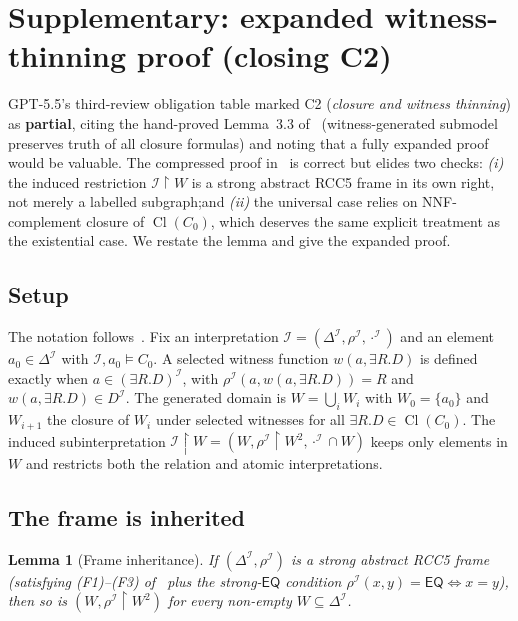 \documentclass[11pt]{article}
\newtheorem{lemma}[theorem]{Lemma}
\newcommand{\Cl}{\operatorname{Cl}}
\newcommand{\EQ}{\mathsf{EQ}}
\newcommand{\I}{\mathcal{I}}
\newcommand{\PARTIAL}{\textcolor{black!60!orange}{\textbf{partial}}}
\begin{document}
\section{Supplementary: expanded witness-thinning proof (closing C2)}
\label{sec:thinning}

GPT-5.5's third-review obligation table marked C2 (\emph{closure and
witness thinning}) as \PARTIAL{}, citing the hand-proved
Lemma~3.3 of~\cite{repaired} (witness-generated submodel preserves
truth of all closure formulas) and noting that a fully expanded
proof would be valuable.  The compressed proof
in~\cite[\S3.3]{repaired} is correct but elides two checks:\@
\emph{(i)} the induced restriction \(\I \restriction W\) is a strong
abstract RCC5 frame in its own right, not merely a labelled
subgraph;\@ and \emph{(ii)} the universal case relies on
NNF-complement closure of \(\Cl(C_0)\), which deserves the same
explicit treatment as the existential case.  We restate the lemma
and give the expanded proof.

\subsection{Setup}

The notation follows~\cite[\S3.3]{repaired}.  Fix an interpretation
\(\I = (\Delta^\I, \rho^\I, \cdot^\I)\) and an element
\(a_0 \in \Delta^\I\) with \(\I, a_0 \models C_0\).  A selected
witness function \(w(a, \exists R.D)\) is defined exactly when
\(a \in (\exists R.D)^\I\), with \(\rho^\I(a, w(a,\exists R.D)) = R\)
and \(w(a, \exists R.D) \in D^\I\).  The generated domain is
\(W = \bigcup_i W_i\) with \(W_0 = \{a_0\}\) and \(W_{i+1}\) the
closure of \(W_i\) under selected witnesses for all
\(\exists R.D \in \Cl(C_0)\).  The induced subinterpretation
\(\I \restriction W = (W, \rho^\I \restriction W^2, \cdot^\I \cap W)\)
keeps only elements in \(W\) and restricts both the relation and
atomic interpretations.

\subsection{The frame is inherited}

\begin{lemma}[Frame inheritance]\label{lem:frame-inherited}
If \((\Delta^\I, \rho^\I)\) is a strong abstract RCC5 frame
(satisfying \textnormal{(F1)--(F3)} of~\cite[Def.~3.2]{repaired}
plus the strong-\(\EQ\) condition \(\rho^\I(x, y) = \EQ \iff x = y\)),
then so is \((W, \rho^\I \restriction W^2)\) for every non-empty
\(W \subseteq \Delta^\I\).
\end{lemma}
\end{document}
